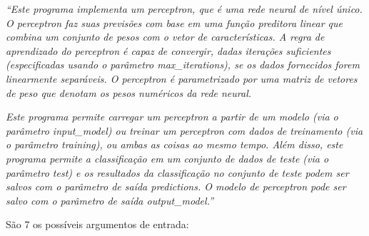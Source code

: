 \documentclass[
  a4paperpaper,
]{article}
\begin{document}
\emph{``Este programa implementa um perceptron, que é uma rede neural de
nível único. O perceptron faz suas previsões com base em uma função
preditora linear que combina um conjunto de pesos com o vetor de
características. A regra de aprendizado do perceptron é capaz de
convergir, dadas iterações suficientes (especificadas usando o parâmetro
max\_iterations), se os dados fornecidos forem linearmente separáveis. O
perceptron é parametrizado por uma matriz de vetores de peso que denotam
os pesos numéricos da rede neural.}

\emph{Este programa permite carregar um perceptron a partir de um modelo
(via o parâmetro input\_model) ou treinar um perceptron com dados de
treinamento (via o parâmetro training), ou ambas as coisas ao mesmo
tempo. Além disso, este programa permite a classificação em um conjunto
de dados de teste (via o parâmetro test) e os resultados da
classificação no conjunto de teste podem ser salvos com o parâmetro de
saída predictions. O modelo de perceptron pode ser salvo com o parâmetro
de saída output\_model.''}

São 7 os possíveis argumentos de entrada:
\end{document}
